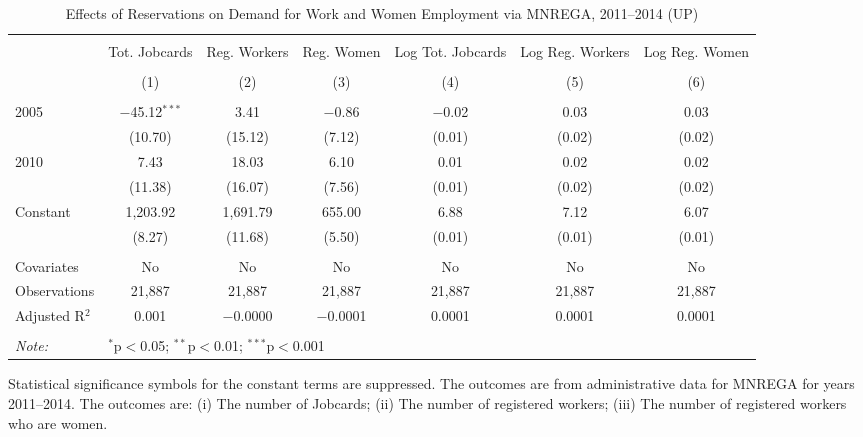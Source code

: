 \begin{sidewaystable}[!htbp]
\centering
\begin{threeparttable}

  \caption{Effects of Reservations on Demand for Work and Women Employment via MNREGA, 2011--2014 (UP)} 
  \label{mnrega_main_up} 
\scriptsize 
\begin{tabular}{@{\extracolsep{0pt}}lcccccc} 
\\[-1.8ex]\hline 
\hline \\[-1.8ex] 
 & Tot. Jobcards & Reg. Workers & Reg. Women & Log Tot. Jobcards & Log Reg. Workers & Log Reg. Women \\ 
\\[-1.8ex] & (1) & (2) & (3) & (4) & (5) & (6)\\ 
\hline \\[-1.8ex] 
 2005 & $-$45.12$^{***}$ & 3.41 & $-$0.86 & $-$0.02 & 0.03 & 0.03 \\ 
  & (10.70) & (15.12) & (7.12) & (0.01) & (0.02) & (0.02) \\ 
  2010 & 7.43 & 18.03 & 6.10 & 0.01 & 0.02 & 0.02 \\ 
  & (11.38) & (16.07) & (7.56) & (0.01) & (0.02) & (0.02) \\ 
  Constant & 1,203.92 & 1,691.79 & 655.00 & 6.88 & 7.12 & 6.07 \\ 
  & (8.27) & (11.68) & (5.50) & (0.01) & (0.01) & (0.01) \\ 
 \hline \\[-1.8ex] 
Covariates & No & No & No & No & No & No \\ 
Observations & 21,887 & 21,887 & 21,887 & 21,887 & 21,887 & 21,887 \\ 
Adjusted R$^{2}$ & 0.001 & $-$0.0000 & $-$0.0001 & 0.0001 & 0.0001 & 0.0001 \\ 
\hline 
\hline \\[-1.8ex] 
\textit{Note:}  & \multicolumn{6}{l}{$^{*}$p$<$0.05; $^{**}$p$<$0.01; $^{***}$p$<$0.001} \\ 
\end{tabular} 
\begin{tablenotes}[flushleft]
\setlength{\itemindent}{0em}
\scriptsize
\item Statistical significance symbols for the constant terms are suppressed. The outcomes are from administrative data for MNREGA for years 2011--2014. The outcomes are: 
                     (i) The number of Jobcards; 
                     (ii) The number of registered workers;
                     (iii) The number of registered workers who are women.
\end{tablenotes}
\end{threeparttable}
\end{sidewaystable}
